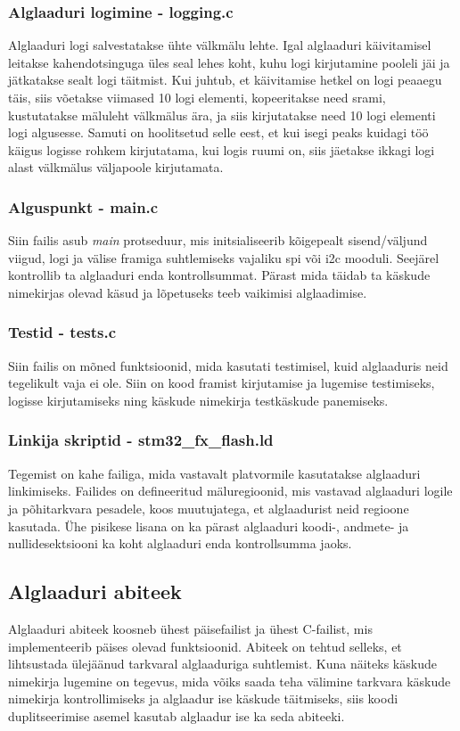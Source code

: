 \documentclass[12pt,a4paper]{article}
\begin{document}
\subsubsection{Alglaaduri logimine - \textbf{logging.c}}
Alglaaduri logi salvestatakse ühte välkmälu lehte. Igal alglaaduri käivitamisel
leitakse kahendotsinguga üles seal lehes koht, kuhu logi kirjutamine pooleli jäi
ja jätkatakse sealt logi täitmist. Kui juhtub, et käivitamise hetkel on logi
peaaegu täis, siis võetakse viimased 10 logi elementi, kopeeritakse need \gls{sram}i,
kustutatakse mäluleht välkmälus ära, ja siis kirjutatakse need 10 logi elementi
logi algusesse. Samuti on hoolitsetud selle eest, et kui isegi peaks kuidagi töö
käigus logisse rohkem kirjutatama, kui logis ruumi on, siis jäetakse ikkagi logi
alast välkmälus väljapoole kirjutamata.

\subsubsection{Alguspunkt - \textbf{main.c}}
Siin failis asub \textit{main} protseduur, mis initsialiseerib kõigepealt
sisend/väljund viigud, logi ja välise \gls{fram}iga suhtlemiseks vajaliku \gls{spi} või \gls{i2c}
mooduli. Seejärel kontrollib ta alglaaduri enda kontrollsummat. Pärast mida
täidab ta käskude nimekirjas olevad käsud ja lõpetuseks teeb vaikimisi
alglaadimise.

\subsubsection{Testid - \textbf{tests.c}}
Siin failis on mõned funktsioonid, mida kasutati testimisel, kuid alglaaduris
neid tegelikult vaja ei ole. Siin on kood \gls{fram}ist kirjutamise ja lugemise
testimiseks, logisse kirjutamiseks ning käskude nimekirja testkäskude
panemiseks.

\subsubsection{Linkija skriptid - \textbf{stm32\_fx\_flash.ld}}
Tegemist on kahe failiga, mida vastavalt platvormile kasutatakse alglaaduri
linkimiseks. Failides on defineeritud mäluregioonid, mis vastavad alglaaduri
logile ja põhitarkvara pesadele, koos muutujatega, et alglaadurist neid regioone
kasutada. Ühe pisikese lisana on ka pärast alglaaduri koodi-, andmete- ja
nullidesektsiooni ka koht alglaaduri enda kontrollsumma jaoks.

\subsection{Alglaaduri abiteek}
Alglaaduri abiteek koosneb ühest päisefailist ja ühest C-failist, mis
implementeerib päises olevad funktsioonid. Abiteek on tehtud selleks, et
lihtsustada ülejäänud tarkvaral alglaaduriga suhtlemist. Kuna näiteks käskude
nimekirja lugemine on tegevus, mida võiks saada teha välimine tarkvara käskude
nimekirja kontrollimiseks ja alglaadur ise käskude täitmiseks, siis koodi
duplitseerimise asemel kasutab alglaadur ise ka seda abiteeki.
\end{document}
